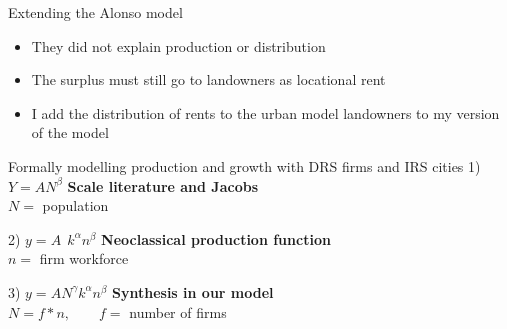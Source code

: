 \documentclass[hide notes=show/only]{beamer} %
\begin{document}
\begin{frame}{Extending the Alonso model}
\begin{itemize}\Large
    \item They did not explain production or distribution
    \item     The surplus must still go to landowners as locational rent
    \item I add the distribution of rents to the urban model landowners to my version of the model
\end{itemize}
\end{frame}







\begin{frame}{Formally modelling production and growth with DRS firms and IRS cities}%
\huge 
1) $Y=AN^\beta$ {\normalsize \hfill \textbf{Scale literature and Jacobs}\\\hfill $N =$ population}
\vspace{.5cm}

2) $y=A\:\ k^\alpha n^\beta$ {\normalsize \hfill \textbf{Neoclassical production function}\\ \hfill$n =$ firm workforce}
\vspace{.5cm}

3) $y=AN^\gamma k^\alpha n^\beta$ {\normalsize \hfill \textbf{Synthesis in our model}\\\hfill $N = f*n, \qquad f=$ number of firms}
\end{frame}
\end{document}
